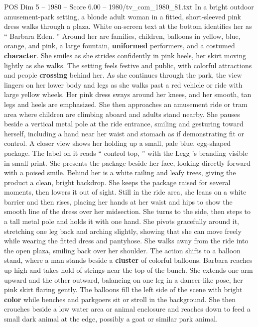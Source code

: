 \begin{textsample}{POS Dim 5 – 1980 – Score 6.00 – 1980/tv\_com\_1980\_81.txt}  \label{ex:f5_pos_038}
In a bright outdoor amusement-park setting, a blonde adult woman in a fitted, short-sleeved pink dress walks through a plaza.
White on-screen text at the bottom identifies her as “ Barbara Eden. ” Around her are families, children, balloons in yellow, blue, orange, and pink, a large fountain, \textbf{uniformed} performers, and a costumed \textbf{character}.
She smiles as she strides confidently in pink heels, her skirt moving lightly as she walks.
The setting feels festive and public, with colorful attractions and people \textbf{crossing} behind her.
As she continues through the park, the view lingers on her lower body and legs as she walks past a red vehicle or ride with large yellow wheels.
Her pink dress sways around her knees, and her smooth, tan legs and heels are emphasized.
She then approaches an amusement ride or tram area where children are climbing aboard and adults stand nearby.
She pauses beside a vertical metal pole at the ride entrance, smiling and gesturing toward herself, including a hand near her waist and stomach as if demonstrating fit or control.
A closer view shows her holding up a small, pale blue, egg-shaped package.
The label on it reads “ control top, ” with the Legg ’s branding visible in small print.
She presents the package beside her face, looking directly forward with a poised smile.
Behind her is a white railing and leafy trees, giving the product a clean, bright backdrop.
She keeps the package raised for several moments, then lowers it out of sight.
Still in the ride area, she leans on a white barrier and then rises, placing her hands at her waist and hips to show the smooth line of the dress over her midsection.
She turns to the side, then steps to a tall metal pole and holds it with one hand.
She pivots gracefully around it, stretching one leg back and arching slightly, showing that she can move freely while wearing the fitted dress and pantyhose.
She walks away from the ride into the open plaza, smiling back over her shoulder.
The action shifts to a balloon stand, where a man stands beside a \textbf{cluster} of colorful balloons.
Barbara reaches up high and takes hold of strings near the top of the bunch.
She extends one arm upward and the other outward, balancing on one leg in a dancer-like pose, her pink skirt flaring gently.
The balloons fill the left side of the scene with bright \textbf{color} while benches and parkgoers sit or stroll in the background.
She then crouches beside a low water area or animal enclosure and reaches down to feed a small dark animal at the edge, possibly a goat or similar park animal.

\end{textsample}
